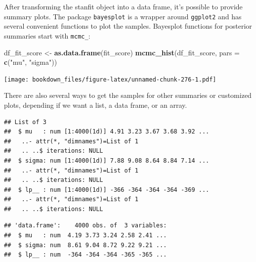 \documentclass[12pt,]{krantz}
\newenvironment{Shaded}{\begin{snugshade}}{\end{snugshade}}
\newcommand{\KeywordTok}[1]{\textcolor[rgb]{0.13,0.29,0.53}{\textbf{#1}}}
\newcommand{\DataTypeTok}[1]{\textcolor[rgb]{0.13,0.29,0.53}{#1}}
\newcommand{\DecValTok}[1]{\textcolor[rgb]{0.00,0.00,0.81}{#1}}
\newcommand{\StringTok}[1]{\textcolor[rgb]{0.31,0.60,0.02}{#1}}
\newcommand{\OperatorTok}[1]{\textcolor[rgb]{0.81,0.36,0.00}{\textbf{#1}}}
\newcommand{\NormalTok}[1]{#1}
\theoremstyle{definition}
\theoremstyle{definition}
\theoremstyle{definition}
\theoremstyle{remark}
\begin{document}
After transforming the stanfit object into a data frame, it's possible
to provide summary plots. The package \texttt{bayesplot}
\citep{R-bayesplot} is a wrapper around \texttt{ggplot2}
\citep{R-ggplot2} and has several convenient functions to plot the
samples. Bayesplot functions for posterior summaries start with
\texttt{mcmc\_}:

\begin{Shaded}
\begin{Highlighting}[]
\NormalTok{df_fit_score <-}\StringTok{ }\KeywordTok{as.data.frame}\NormalTok{(fit_score)}
\KeywordTok{mcmc_hist}\NormalTok{(df_fit_score, }\DataTypeTok{pars =} \KeywordTok{c}\NormalTok{(}\StringTok{"mu"}\NormalTok{, }\StringTok{"sigma"}\NormalTok{)) }
\end{Highlighting}
\end{Shaded}

\texttt{[image: bookdown\_files/figure-latex/unnamed-chunk-276-1.pdf]}

There are also several ways to get the samples for other summaries or
customized plots, depending if we want a list, a data frame, or an
array.

\begin{Shaded}
\end{Shaded}

\begin{verbatim}
## List of 3
##  $ mu   : num [1:4000(1d)] 4.91 3.23 3.67 3.68 3.92 ...
##   ..- attr(*, "dimnames")=List of 1
##   .. ..$ iterations: NULL
##  $ sigma: num [1:4000(1d)] 7.88 9.08 8.64 8.84 7.14 ...
##   ..- attr(*, "dimnames")=List of 1
##   .. ..$ iterations: NULL
##  $ lp__ : num [1:4000(1d)] -366 -364 -364 -364 -369 ...
##   ..- attr(*, "dimnames")=List of 1
##   .. ..$ iterations: NULL
\end{verbatim}

\begin{Shaded}
\end{Shaded}

\begin{verbatim}
## 'data.frame':    4000 obs. of  3 variables:
##  $ mu   : num  4.19 3.73 3.24 2.58 2.41 ...
##  $ sigma: num  8.61 9.04 8.72 9.22 9.21 ...
##  $ lp__ : num  -364 -364 -364 -365 -365 ...
\end{verbatim}
\end{document}

